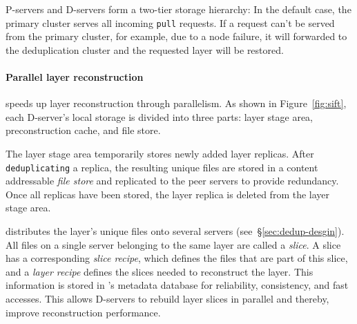 P-servers and D-servers form a two-tier storage hierarchy:
In the default case, the primary cluster serves all incoming \texttt{pull} requests.
If a request can't be served from the primary cluster, for example, due to a node failure,
it will forwarded to the deduplication cluster and the requested layer will be restored.
%
%

\paragraph{Parallel layer reconstruction}

\sysname speeds up layer reconstruction through parallelism. As shown in Figure~\ref{fig:sift},
each D-server's local storage is divided into three parts: layer stage area, preconstruction cache,
and file store.
%

The layer stage area temporarily stores newly added layer replicas.
After \texttt{deduplicating} a replica, the resulting unique files are stored in a content 
addressable \emph{file store} and replicated to the peer servers to
provide redundancy. Once all replicas have been stored, the layer replica is deleted from the
layer stage area. 

\sysname distributes the layer's unique files
onto several servers (see~\S\ref{sec:dedup-desgin}).
%
All files on a single server belonging to the same layer are called a \emph{slice}. A slice
has a corresponding \emph{slice recipe}, which defines the files that are part of this slice,
and a \emph{layer recipe} defines the slices needed to reconstruct the layer. This information
is stored in \sysname{}'s metadata database
for reliability, consistency, and fast accesses. 
%
This allows D-servers to rebuild layer slices in parallel and thereby, improve reconstruction
performance.
%

